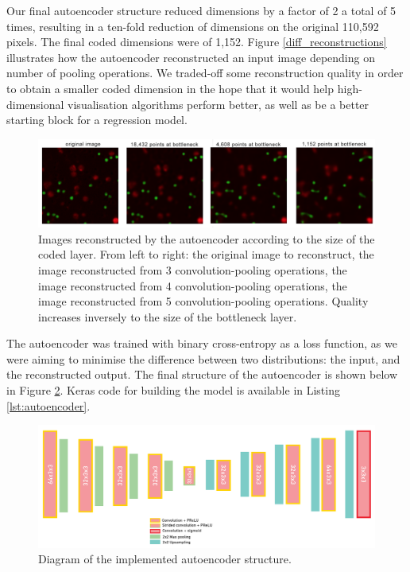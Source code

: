 Our final autoencoder structure reduced dimensions by a factor of 2 a total of 5 times, resulting in a ten-fold reduction of dimensions on the original 110,592 pixels. The final coded dimensions were of 1,152. Figure \ref{diff_reconstructions} illustrates how the autoencoder reconstructed an input image depending on number of pooling operations. We traded-off some reconstruction quality in order to obtain a smaller coded dimension in the hope that it would help high-dimensional visualisation algorithms perform better, as well as be a better starting block for a regression model.

\begin{figure}[h]
    \centering
    \includegraphics[width=\textwidth]{dissertation/figures/reduction_trade_off.png}
    \caption{Images reconstructed by the autoencoder according to the size of the coded layer. From left to right: the original image to reconstruct, the image reconstructed from 3 convolution-pooling operations, the image reconstructed from 4 convolution-pooling operations, the image reconstructed from 5 convolution-pooling operations. Quality increases inversely to the size of the bottleneck layer.}
    \label{fig:diff_reconstructions}
\end{figure}

The autoencoder was trained with binary cross-entropy as a loss function, as we were aiming to minimise the difference between two distributions: the input, and the reconstructed output. The final structure of the autoencoder is shown below in Figure \ref{fig:autoencoder_details}. Keras code for building the model is available in Listing \ref{lst:autoencoder}.

\begin{figure}[h]
    \centering
    \includegraphics[width=\textwidth]{dissertation/figures/autoencoder_final_structure.png}
    \caption{Diagram of the implemented autoencoder structure.}
    \label{fig:autoencoder_details}
\end{figure}

